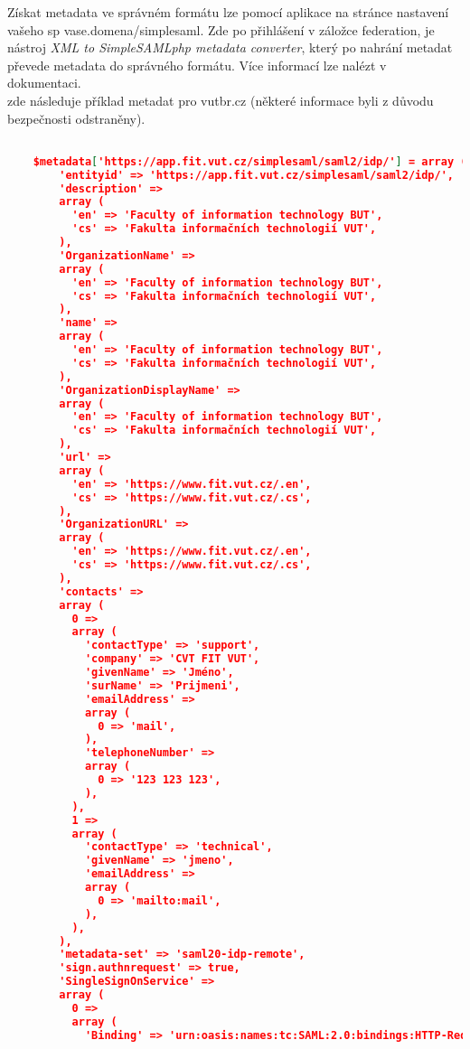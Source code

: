 Získat metadata ve správném formátu lze pomocí aplikace na stránce nastavení vašeho sp vase.domena/simplesaml.
Zde po přihlášení v záložce federation, je nástroj \emph{XML to SimpleSAMLphp metadata converter}, který po nahrání metadat převede metadata do správného formátu.
Více informací lze nalézt v dokumentaci.%
\\
zde následuje příklad metadat pro vutbr.cz (některé informace byli z důvodu bezpečnosti odstraněny).
\begin{lstlisting}[language=json]

    $metadata['https://app.fit.vut.cz/simplesaml/saml2/idp/'] = array (
        'entityid' => 'https://app.fit.vut.cz/simplesaml/saml2/idp/',
        'description' =>
        array (
          'en' => 'Faculty of information technology BUT',
          'cs' => 'Fakulta informačních technologií VUT',
        ),
        'OrganizationName' =>
        array (
          'en' => 'Faculty of information technology BUT',
          'cs' => 'Fakulta informačních technologií VUT',
        ),
        'name' =>
        array (
          'en' => 'Faculty of information technology BUT',
          'cs' => 'Fakulta informačních technologií VUT',
        ),
        'OrganizationDisplayName' =>
        array (
          'en' => 'Faculty of information technology BUT',
          'cs' => 'Fakulta informačních technologií VUT',
        ),
        'url' =>
        array (
          'en' => 'https://www.fit.vut.cz/.en',
          'cs' => 'https://www.fit.vut.cz/.cs',
        ),
        'OrganizationURL' =>
        array (
          'en' => 'https://www.fit.vut.cz/.en',
          'cs' => 'https://www.fit.vut.cz/.cs',
        ),
        'contacts' =>
        array (
          0 =>
          array (
            'contactType' => 'support',
            'company' => 'CVT FIT VUT',
            'givenName' => 'Jméno',
            'surName' => 'Prijmeni',
            'emailAddress' =>
            array (
              0 => 'mail',
            ),
            'telephoneNumber' =>
            array (
              0 => '123 123 123',
            ),
          ),
          1 =>
          array (
            'contactType' => 'technical',
            'givenName' => 'jmeno',
            'emailAddress' =>
            array (
              0 => 'mailto:mail',
            ),
          ),
        ),
        'metadata-set' => 'saml20-idp-remote',
        'sign.authnrequest' => true,
        'SingleSignOnService' =>
        array (
          0 =>
          array (
            'Binding' => 'urn:oasis:names:tc:SAML:2.0:bindings:HTTP-Redirect',

\end{lstlisting}
